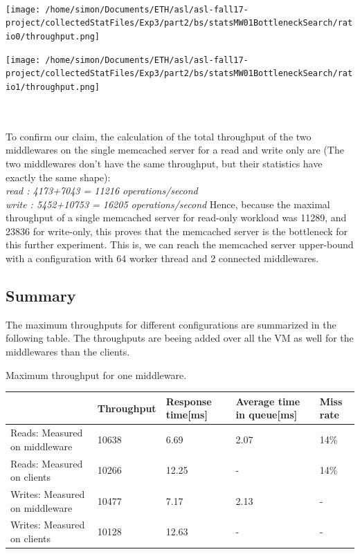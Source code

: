\documentclass[11pt,a4paper]{article}
\begin{document}
\\
\begin{minipage}{0.5\linewidth}
\texttt{[image: /home/simon/Documents/ETH/asl/asl-fall17-project/collectedStatFiles/Exp3/part2/bs/statsMW01BottleneckSearch/ratio0/throughput.png]}
\end{minipage}
\hfill
\begin{minipage}{0.5\linewidth}
\texttt{[image: /home/simon/Documents/ETH/asl/asl-fall17-project/collectedStatFiles/Exp3/part2/bs/statsMW01BottleneckSearch/ratio1/throughput.png]}
\end{minipage}
\\\\
To confirm our claim, the calculation of the total throughput of the two middlewares on the single memcached server for a read and write only are (The two middlewares don't have the same throughput, but their statistics have exactly the same shape):
\\\textit{read : 4173+7043 = 11216 operations/second}
\\\textit{write : 5452+10753 = 16205 operations/second}
Hence, because the maximal throughput of a single memcached server for read-only workload was 11289, and 23836 for write-only, this proves that the memcached server is the bottleneck for this further experiment. This is, we can reach the memcached server upper-bound with a configuration with 64 worker thread and 2 connected middlewares. 



\subsection{Summary}
The maximum throughputs for different configurations are summarized in the following table. The throughputs are beeing added over all the VM as well for the middlewares than the clients. 

\begin{center}
	{Maximum throughput for one middleware.}
	\begin{tabular}{|l|p{2cm}|p{2cm}|p{2cm}|p{2cm}|}
		\hline                                & Throughput & Response time[ms] & Average time in queue[ms] & Miss rate \\ 
		\hline Reads: Measured on middleware  &10638           &6.69              &2.07                       &14\%           \\ 
		\hline Reads: Measured on clients     &10266            &12.25               &-                  &14\%           \\ 
		\hline Writes: Measured on middleware &10477            &7.17               &2.13                       &-      \\ 
		\hline Writes: Measured on clients    &10128            &12.63               &-                  &-       \\ 
		\hline 
	\end{tabular}
\end{center}
\end{document}
